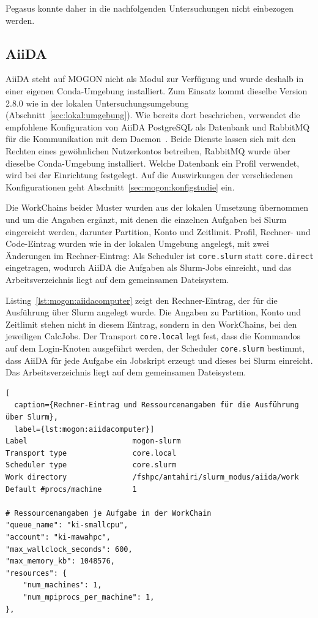 Pegasus konnte daher in die nachfolgenden Untersuchungen nicht einbezogen werden.

\subsection{AiiDA}
\label{sec:mogon:aiida}
AiiDA steht auf MOGON nicht als Modul zur Verfügung und wurde
deshalb in einer eigenen Conda-Umgebung installiert. Zum Einsatz
kommt dieselbe Version 2.8.0 wie in der lokalen
Untersuchungsumgebung (Abschnitt~\ref{sec:lokal:umgebung}). Wie bereits dort beschrieben, verwendet die empfohlene Konfiguration von AiiDA PostgreSQL als Datenbank und RabbitMQ für die Kommunikation mit dem Daemon~\cite{aiidadocs-install}. Beide Dienste lassen sich mit den Rechten eines gewöhnlichen
Nutzerkontos betreiben, RabbitMQ wurde über dieselbe Conda-Umgebung
installiert. Welche Datenbank ein Profil verwendet, wird bei der Einrichtung
festgelegt. Auf die Auswirkungen der verschiedenen
Konfigurationen geht Abschnitt~\ref{sec:mogon:konfigstudie} ein.

Die WorkChains beider Muster wurden aus der lokalen Umsetzung
übernommen und um die Angaben ergänzt, mit denen die einzelnen
Aufgaben bei Slurm eingereicht werden, darunter Partition, Konto
und Zeitlimit. Profil, Rechner- und Code-Eintrag wurden wie in der
lokalen Umgebung angelegt, mit zwei Änderungen im Rechner-Eintrag:
Als Scheduler ist \texttt{core.slurm} statt \texttt{core.direct}
eingetragen, wodurch AiiDA die Aufgaben als Slurm-Jobs einreicht,
und das Arbeitsverzeichnis liegt auf dem gemeinsamen Dateisystem.

Listing~\ref{lst:mogon:aiidacomputer} zeigt den Rechner-Eintrag, der
für die Ausführung über Slurm angelegt wurde. Die Angaben zu
Partition, Konto und Zeitlimit stehen nicht in diesem Eintrag,
sondern in den WorkChains, bei den jeweiligen CalcJobs. Der Transport
\texttt{core.local} legt fest, dass die Kommandos auf dem
Login-Knoten ausgeführt werden, der Scheduler \texttt{core.slurm}
bestimmt, dass AiiDA für jede Aufgabe ein Jobskript erzeugt und
dieses bei Slurm einreicht. Das Arbeitsverzeichnis liegt auf dem
gemeinsamen Dateisystem. 

\begin{lstlisting}[
  caption={Rechner-Eintrag und Ressourcenangaben für die Ausführung über Slurm},
  label={lst:mogon:aiidacomputer}]
Label                        mogon-slurm
Transport type               core.local
Scheduler type               core.slurm
Work directory               /fshpc/antahiri/slurm_modus/aiida/work
Default #procs/machine       1

# Ressourcenangaben je Aufgabe in der WorkChain
"queue_name": "ki-smallcpu",
"account": "ki-mawahpc",
"max_wallclock_seconds": 600,
"max_memory_kb": 1048576,
"resources": {
    "num_machines": 1,
    "num_mpiprocs_per_machine": 1,
},
\end{lstlisting}


